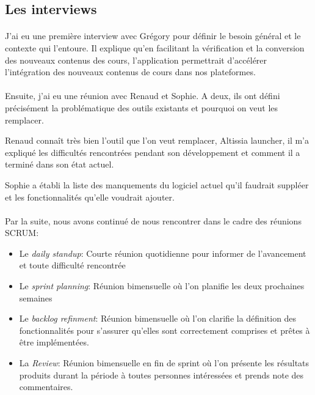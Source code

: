 \subsection{Les interviews}
\label{subsec:interviews}

\paragraph{}
J'ai eu une première interview avec Grégory pour définir le besoin général et le contexte qui l'entoure.
Il explique qu'en facilitant la vérification et la conversion des nouveaux contenus des cours, l'application permettrait d'accélérer l'intégration des nouveaux contenus de cours dans nos plateformes.

\paragraph{}
Ensuite, j'ai eu une réunion avec Renaud et Sophie.
A deux, ils ont défini précisément la problématique des outils existants et pourquoi on veut les remplacer.

Renaud connaît très bien l'outil que l'on veut remplacer, Altissia launcher, il m'a expliqué les difficultés rencontrées pendant son développement et comment il a terminé dans son état actuel.

Sophie a établi la liste des manquements du logiciel actuel qu'il faudrait suppléer et les fonctionnalités qu'elle voudrait ajouter.

\paragraph{}
Par la suite, nous avons continué de nous rencontrer dans le cadre des réunions SCRUM:
\begin{itemize}
    \item Le \textit{daily standup}: Courte réunion quotidienne pour informer de l'avancement et toute difficulté rencontrée
    \item Le \textit{sprint planning}: Réunion bimensuelle où l'on planifie les deux prochaines semaines
    \item Le \textit{backlog refinment}: Réunion bimensuelle où l'on clarifie la définition des fonctionnalités pour s'assurer qu'elles sont correctement comprises et prêtes à être implémentées.
    \item La \textit{Review}: Réunion bimensuelle en fin de sprint où l'on présente les résultats produits durant la période à toutes personnes intéressées et prends note des commentaires.
\end{itemize}

